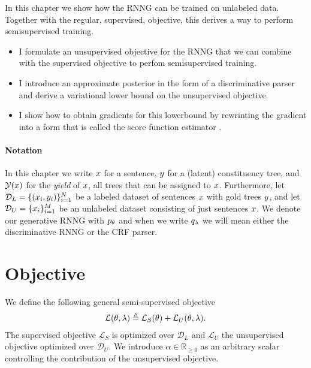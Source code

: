 % 

In this chapter we show how the RNNG can be trained on unlabeled data. Together with the regular, supervised, objective, this derives a way to perform semisupervised training.
\begin{itemize}
  \item I formulate an unsupervised objective for the RNNG that we can combine with the supervised objective to perfom semisupervised training.
  \item I introduce an approximate posterior in the form of a discriminative parser and derive a variational lower bound on the unsupervised objective.
  \item I show how to obtain gradients for this lowerbound by rewrinting the gradient into a form that is called the score function estimator \citep{Williams1992:REINFORCE,Fu2006}.
\end{itemize}

\paragraph{Notation} In this chapter we write $x$ for a sentence, $y$ for a (latent) constituency tree, and $\mathcal{Y}(x)$ for the \textit{yield} of $x$, all trees that can be assigned to $x$. Furthermore, let $\mathcal{D}_L = \{ (x_i, y_i)\}_{i=1}^N$ be a labeled dataset of sentences $x$ with gold trees $y$, and let $\mathcal{D}_U = \{ x_i \}_{i=1}^M$ be an unlabeled dataset consisting of just sentences $x$. We denote our generative RNNG with $p_{\theta}$ and when we write $q_{\lambda}$ we will mean either the discriminative RNNG or the CRF parser.

\section{Objective}
We define the following general semi-supervised objective
\begin{align*}
  \mathcal{L}(\theta, \lambda) \triangleq \mathcal{L}_{S}(\theta) + \mathcal{L}_{U}(\theta, \lambda).
\end{align*}
The supervised objective $\mathcal{L}_{S}$ is optimized over $\mathcal{D}_L$ and $\mathcal{L}_{U}$ the unsupervised objective optimized over $\mathcal{D}_U$. We introduce $\alpha \in \mathbb{R}_{\geq 0}$ as an arbitrary scalar controlling the contribution of the unsupervised objective.

